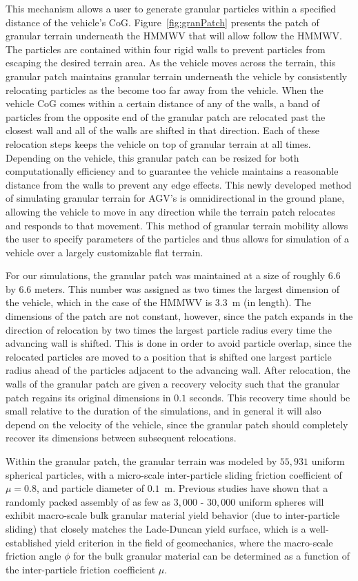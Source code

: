 \documentclass[12pt,twocolumn]{article}
\newcommand{\CHRONO}{{\sffamily{{Chrono}}}}
\begin{document}
This mechanism allows a user to generate granular particles within a specified distance of the vehicle's CoG. Figure~\ref{fig:granPatch} presents the patch of granular terrain underneath the {\CHRONO}  HMMWV that will allow follow the HMMWV. The particles are contained within four rigid walls to prevent particles from escaping the desired terrain area. As the vehicle moves across the terrain, this granular patch maintains granular terrain underneath the vehicle by consistently relocating particles as the become too far away from the vehicle. When the vehicle CoG comes within a certain distance of any of the walls, a band of particles from the opposite end of the granular patch are relocated past the closest wall and all of the walls are shifted in that direction. Each of these relocation steps keeps the vehicle on top of granular terrain at all times. Depending on the vehicle, this granular patch can be resized for both computationally efficiency and to guarantee the vehicle maintains a reasonable distance from the walls to prevent any edge effects. This newly developed method of simulating granular terrain for AGV's is omnidirectional in the ground plane, allowing the vehicle to move in any direction while the terrain patch relocates and responds to that movement. This method of granular terrain mobility allows the user to specify parameters of the particles and thus allows for simulation of a vehicle over a largely customizable flat terrain.

For our simulations, the granular patch was maintained at a size of roughly $6.6$ by $6.6$ meters.  This number was assigned as two times the largest dimension of the vehicle, which in the case of the HMMWV is $3.3$~m (in length).  The dimensions of the patch are not constant, however, since the patch expands in the direction of relocation by two times the largest particle radius every time the advancing wall is shifted.  This is done in order to avoid particle overlap, since the relocated particles are moved to a position that is shifted one largest particle radius ahead of the particles adjacent to the advancing wall.  After relocation, the walls of the granular patch are given a recovery velocity such that the granular patch regains its original dimensions in $0.1$ seconds.  This recovery time should be small relative to the duration of the simulations, and in general it will also depend on the velocity of the vehicle, since the granular patch should completely recover its dimensions between subsequent relocations.

Within the granular patch, the granular terrain was modeled by $55,931$ uniform spherical particles, with a micro-scale inter-particle sliding friction coefficient of $\mu = 0.8$, and particle diameter of $0.1$~m.  Previous studies \cite{fleischmannetalGEGE2014} have shown that 
a randomly packed assembly of as few as $3,000$ - $30,000$ uniform spheres will exhibit macro-scale bulk granular material yield behavior (due to inter-particle sliding) that closely matches the Lade-Duncan yield surface, which is a well-established yield criterion in the field of geomechanics, where the macro-scale friction angle $\phi$ for the bulk granular material can be determined as a function of the inter-particle friction coefficient $\mu$.
\end{document}
